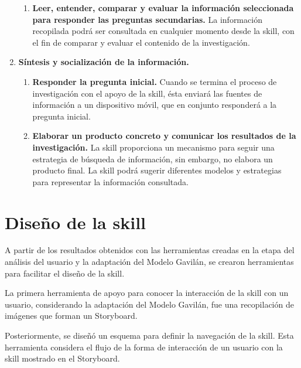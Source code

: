 \begin{enumerate}
\begin{enumerate}[1.]
    \item \textbf{Leer, entender, comparar y evaluar la información seleccionada para responder las preguntas secundarias.} La información recopilada podrá ser consultada en cualquier momento desde la skill, con el fin de comparar y evaluar el contenido de la investigación.
  \end{enumerate}
  \item \textbf{Síntesis y socialización de la información.}
  \begin{enumerate}[1.]
    \item \textbf{Responder la pregunta inicial.} Cuando se termina el proceso de investigación con el apoyo de la skill, ésta enviará las fuentes de información a un dispositivo móvil, que en conjunto responderá a la pregunta inicial.
    \item \textbf{Elaborar un producto concreto y comunicar los resultados de la investigación.} La skill proporciona un mecanismo para seguir una estrategia de búsqueda de información, sin embargo, no elabora un producto final. La skill podrá sugerir diferentes modelos y estrategias para representar la información consultada.
  \end{enumerate}
\end{enumerate}


\section{Diseño de la skill}
\label{DisenioSkillcapIV}

A partir de los resultados obtenidos con las herramientas creadas en la etapa del análisis del usuario y la adaptación del Modelo Gavilán, se crearon herramientas para facilitar el diseño de la skill.

La primera herramienta de apoyo para conocer la interacción de la skill con un usuario, considerando la adaptación del Modelo Gavilán, fue una recopilación de imágenes que forman un Storyboard.

Posteriormente, se diseñó un esquema para definir la navegación de la skill. Esta herramienta considera el flujo de la forma de interacción de un usuario con la skill mostrado en el Storyboard.


